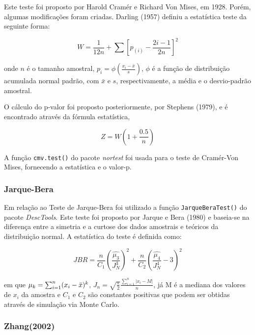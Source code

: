 \documentclass[a4paper,11pt]{article} %
\begin{document}
Este teste foi proposto por Harold Cramér e Richard Von Mises, em 1928. Porém, algumas modificações foram criadas. Darling (1957) definiu a estatística teste da seguinte forma:

\begin{equation}
    W = \frac{1}{12n} + \sum \left[ p_{(i)} - \frac{2i-1}{2n} \right]^{2}
\end{equation}

onde $n$ é o tamanho amostral, $p_{i} = \phi \left(  \frac{x_{i}-\bar{x}}{s} \right)$, $\phi$ é a função de distribuição acumulada normal padrão, com $\bar{x}$ e $s$, respectivamente, a média e o desvio-padrão amostral.\vskip0.3cm

O cálculo do p-valor foi proposto posteriormente, por Stephens (1979), e é encontrado através da fórmula estatística,

\begin{equation}
    Z = W \left(1 + \frac{0.5}{n} \right)
\end{equation}

A função \texttt{cmv.test()} do pacote \textit{nortest} foi usada para o teste de Cramér-Von Mises, fornecendo a estatística e o valor-p.\vskip0.3cm

\subsubsection{Jarque-Bera}

Em relação ao Teste de Jarque-Bera foi utilizado a função  \texttt{JarqueBeraTest()} do pacote \textit{DescTools}. Este teste foi proposto por Jarque e Bera (1980) e baseia-se na diferença entre a simetria e a curtose dos dados amostrais e teóricos da distribuição normal. A estatística do teste é definida como: 

\begin{equation}
    JBR = \frac{n}{C_{1}} \left( \frac{\hat{\mu_{3}}}{J^{3}_{N}}  \right)^{2} + \frac{n}{C_{2}} \left( \frac{ \hat{\mu_{4}}}{J^{4}_{N}} - 3 \right)^{2} 
\end{equation}


em que $\mu_{k} = \sum_{i=1}^{n} (x_{i}- \Bar{x})^{k}$, $J_{n} = \sqrt{\frac{\pi}{2}}\frac{\sum_{i=1}^{n}|x_{i}-M|}{n}$, já M é a mediana dos valores de $x_{i}$ da amostra e $C_{1}$ e $C_{2}$ são constantes positivas que podem ser obtidas através de simulação via Monte Carlo. \vskip0.3cm

\subsubsection{Zhang(2002)}
\end{document}
